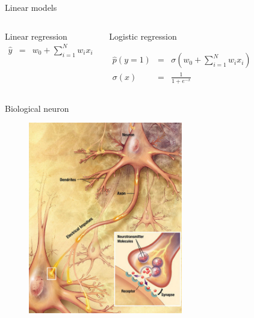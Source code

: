 \documentclass{beamer}
\begin{document}
\begin{frame}{Linear models}

\begin{columns}[t]

\begin{block}{Linear regression}
\begin{eqnarray*}
\hat{y} &=& w_0 + \sum_{i=1}^N w_i x_i
\end{eqnarray*}
\end{block}	
	

\begin{block}{Logistic regression}

\begin{eqnarray*}
\hat{p}\left(y = 1\right) &=& \sigma\left(w_0 + \sum_{i=1}^N w_i x_i\right) \\
\sigma\left(x\right) &=& \frac{1}{1 + e^{-x}}
\end{eqnarray*}
\end{block}
	
\end{columns}

\end{frame}


\begin{frame}{Biological neuron}

\begin{figure}[h!]
  \centering
  \includegraphics[width=0.6\textwidth]{images/bneuron.jpg}
\end{figure}

\end{frame}
\end{document}
